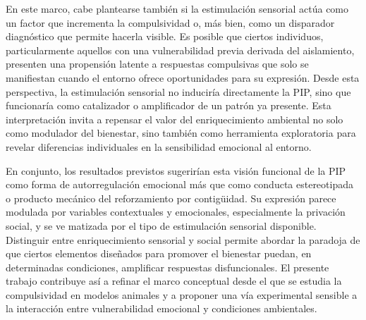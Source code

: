 \documentclass[12pt,a4paper]{article}
\begin{document}
\begin{multicols}{2}
En este marco, cabe plantearse también si la estimulación sensorial actúa como un factor que incrementa la compulsividad o, más bien, como un disparador diagnóstico que permite hacerla visible. Es posible que ciertos individuos, particularmente aquellos con una vulnerabilidad previa derivada del aislamiento, presenten una propensión latente a respuestas compulsivas que solo se manifiestan cuando el entorno ofrece oportunidades para su expresión. Desde esta perspectiva, la estimulación sensorial no induciría directamente la PIP, sino que funcionaría como catalizador o amplificador de un patrón ya presente. Esta interpretación invita a repensar el valor del enriquecimiento ambiental no solo como modulador del bienestar, sino también como herramienta exploratoria para revelar diferencias individuales en la sensibilidad emocional al entorno.

En conjunto, los resultados previstos sugerirían esta visión funcional de la PIP como forma de autorregulación emocional más que como conducta estereotipada o producto mecánico del reforzamiento por contigüidad. Su expresión parece modulada por variables contextuales y emocionales, especialmente la privación social, y se ve matizada por el tipo de estimulación sensorial disponible. Distinguir entre enriquecimiento sensorial y social permite abordar la paradoja de que ciertos elementos diseñados para promover el bienestar puedan, en determinadas condiciones, amplificar respuestas disfuncionales. El presente trabajo contribuye así a refinar el marco conceptual desde el que se estudia la compulsividad en modelos animales y a proponer una vía experimental sensible a la interacción entre vulnerabilidad emocional y condiciones ambientales.





\end{multicols}
\end{document}
